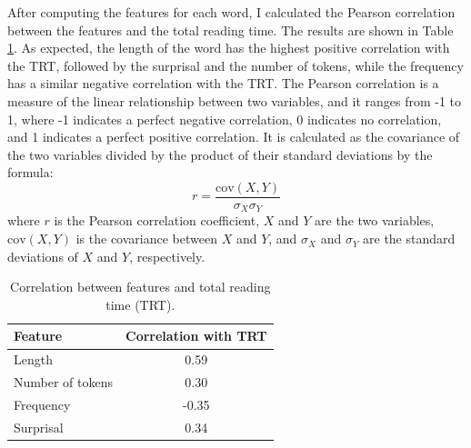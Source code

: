 After computing the features for each word, I calculated the Pearson correlation between the features and the total reading time. The results are shown in Table \ref{tab:feature_correlation}. As expected, the length of the word has the highest positive correlation with the TRT, followed by the surprisal and the number of tokens, while the frequency has a similar negative correlation with the TRT. The Pearson correlation is a measure of the linear relationship between two variables, and it ranges from -1 to 1, where -1 indicates a perfect negative correlation, 0 indicates no correlation, and 1 indicates a perfect positive correlation. It is calculated as the covariance of the two variables divided by the product of their standard deviations by the formula:
\begin{equation}
    r = \frac{\text{cov}(X, Y)}{\sigma_X \sigma_Y}
\end{equation}
where \( r \) is the Pearson correlation coefficient, \( X \) and \( Y \) are the two variables, \( \text{cov}(X, Y) \) is the covariance between \( X \) and \( Y \), and \( \sigma_X \) and \( \sigma_Y \) are the standard deviations of \( X \) and \( Y \), respectively.

\begin{table}
    \centering
    \begin{tabular}{|l|c|}
        \hline
        Feature & Correlation with TRT \\
        \hline
        Length & 0.59 \\
        Number of tokens & 0.30 \\
        Frequency & -0.35 \\
        Surprisal & 0.34 \\
        \hline
    \end{tabular}
    \caption{Correlation between features and total reading time (TRT).}
    \label{tab:feature_correlation}
\end{table}